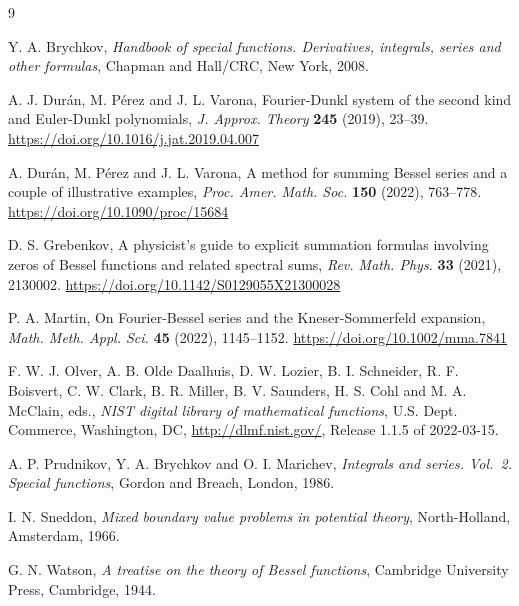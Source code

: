 \documentclass[10pt,leqno,a4paper]{article}
\theoremstyle{plain}
\numberwithin{equation}{section}
\begin{document}
\begin{thebibliography}{9}

Y. A. Brychkov,
\textit{Handbook of special functions. Derivatives, integrals, series and other formulas},
Chapman and Hall/CRC, New York, 2008.

A. J. Dur\'an, M. P\'erez and J. L. Varona,
Fourier-Dunkl system of the second kind and Euler-Dunkl polynomials,
\textit{J. Approx. Theory}
\textbf{245} (2019), 23--39.
\url{https://doi.org/10.1016/j.jat.2019.04.007}

A. Dur\'an, M. P\'erez and J. L. Varona,
{A method for summing Bessel series and a couple of illustrative examples},
\textit{Proc. Amer. Math. Soc.} \textbf{150} (2022), 763--778.
\url{https://doi.org/10.1090/proc/15684}

D. S. Grebenkov,
A physicist's guide to explicit summation formulas involving zeros of Bessel functions and related spectral sums,
\textit{Rev. Math. Phys.} \textbf{33} (2021), 2130002.
\url{https://doi.org/10.1142/S0129055X21300028}

P. A. Martin,
On Fourier-Bessel series and the Kneser-Sommerfeld expansion,
\textit{Math. Meth. Appl. Sci.} \textbf{45} (2022), 1145--1152.
\url{https://doi.org/10.1002/mma.7841}

F. W. J. Olver, A. B. Olde Daalhuis, D. W. Lozier, B. I. Schneider, R. F. Boisvert, C. W. Clark, B. R. Miller, B. V. Saunders, H. S. Cohl and M. A. McClain, eds.,
\textit{NIST digital library of mathematical functions},
U.S. Dept. Commerce, Washington, DC, 
\url{http://dlmf.nist.gov/},
Release 1.1.5 of 2022-03-15.

A. P. Prudnikov, Y. A. Brychkov and O. I. Marichev,
\textit{Integrals and series. Vol.~2. Special functions},
Gordon and Breach, London, 1986.

I. N. Sneddon,
\textit{Mixed boundary value problems in potential theory},
North-Holland, Amsterdam, 1966.

G. N. Watson,
\textit{A treatise on the theory of Bessel functions},
Cambridge University Press, Cambridge, 1944.

\end{thebibliography}

\end{document}
